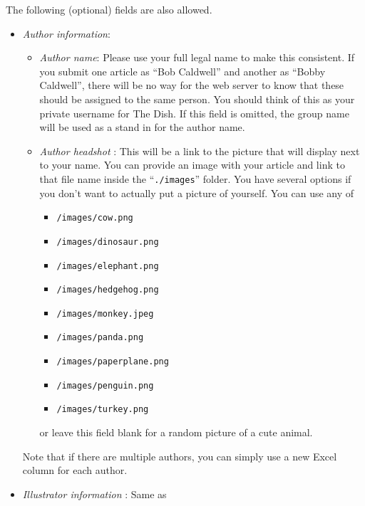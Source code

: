 \documentclass[paper=a4, fontsize=11pt]{scrartcl}
\numberwithin{equation}{section}        %
\numberwithin{figure}{section}            %
\numberwithin{table}{section}                %
\begin{document}
\noindent{}The following (optional) fields are also allowed.
\begin{itemize}
    \item \emph{Author information}:
        \begin{itemize}
            \item \emph{Author name}: Please use your full legal name to make this consistent. If
                you submit one article as ``Bob Caldwell'' and another as ``Bobby
                Caldwell'', there will be no way for the web server to know that
                these should be assigned to the same person. You should think of
                this as your private username for The Dish.
                If this field is omitted, the group name will be used as a stand in for
                the author name.
            \item \emph{Author headshot} : This will be a link to the picture
                that will display next to your name.  You can provide an image
                with your article and link to that file name inside the
                ``\texttt{./images}'' folder. You have several options if you
                don't want to actually put a picture of yourself. You can use
                any of
                \begin{itemize}
                    \item \texttt{/images/cow.png}
                    \item \texttt{/images/dinosaur.png}
                    \item \texttt{/images/elephant.png}
                    \item \texttt{/images/hedgehog.png}
                    \item \texttt{/images/monkey.jpeg}
                    \item \texttt{/images/panda.png}
                    \item \texttt{/images/paperplane.png}
                    \item \texttt{/images/penguin.png}
                    \item \texttt{/images/turkey.png}
                \end{itemize}
                or leave this field blank for a random picture of a
                cute animal.
        \end{itemize}
        Note that if there are multiple authors, you can simply use a new Excel
        column for each author.
    \item \emph{Illustrator information} : Same as

\end{itemize}
\end{document}
